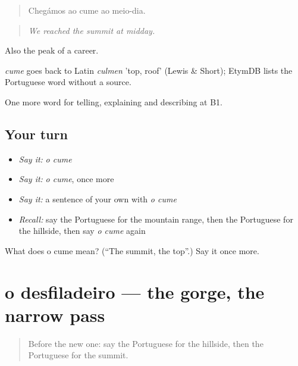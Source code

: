 \begin{quote}
Chegámos ao cume ao meio-dia.
\end{quote}

\begin{quote}
\emph{We reached the summit at midday.}
\end{quote}

Also the peak of a career.

\begin{cousinweb}
\emph{cume} goes back to Latin \emph{culmen} 'top, roof' (Lewis \& Short); EtymDB lists the Portuguese word without a source.
\end{cousinweb}

\begin{grammarlens}[title={What you've built}]
One more word for telling, explaining and describing at B1.
\end{grammarlens}

\subsection*{Your turn}
\begin{itemize}
\raggedright
  \item \emph{Say it:} \emph{o cume}
  \item \emph{Say it:} \emph{o cume}, once more
  \item \emph{Say it:} a sentence of your own with \emph{o cume}
  \item \emph{Recall:} say the Portuguese for the mountain range, then the Portuguese for the hillside, then say \emph{o cume} again
\end{itemize}

\begin{tcolorbox}[breakable,colback=teal!4,colframe=teal!35!black,title={Before you move on}]
What does o cume mean? (\textquotedblleft{}The summit, the top\textquotedblright{}.) Say it once more.
\end{tcolorbox}
\section[o desfiladeiro]{o desfiladeiro — the gorge, the narrow pass}

\label{lesson:PT-C458-desfiladeiro}



\begin{quote}
Before the new one: say the Portuguese for the hillside, then the Portuguese for the summit.
\end{quote}

